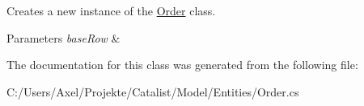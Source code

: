 Creates a new instance of the \hyperlink{class_products_1_1_model_1_1_entities_1_1_order}{Order} class. 


\begin{DoxyParams}{Parameters}
{\em base\+Row} & \\
\hline
\end{DoxyParams}


The documentation for this class was generated from the following file\+:\begin{DoxyCompactItemize}
\item 
C\+:/\+Users/\+Axel/\+Projekte/\+Catalist/\+Model/\+Entities/Order.\+cs\end{DoxyCompactItemize}
